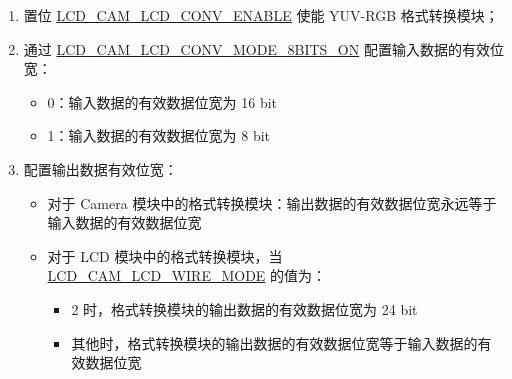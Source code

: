 \documentclass[main\_\_CN.tex]{subfiles}
\begin{document}
\begin{enumerate}
    \item 置位 \hyperref[fielddesc:LCDCAMLCDCONVENABLE]{LCD\_CAM\_LCD\_CONV\_ENABLE} 使能 YUV-RGB 格式转换模块；
    \item 通过 \hyperref[fielddesc:LCDCAMLCDCONVMODE8BITSON]{LCD\_CAM\_LCD\_CONV\_MODE\_8BITS\_ON} 配置输入数据的有效位宽：
    \begin{itemize}
        \item 0：输入数据的有效数据位宽为 16 bit
        \item 1：输入数据的有效数据位宽为 8 bit

    \end{itemize}
    \item 配置输出数据有效位宽：
    \begin{itemize}
        \item 对于 Camera 模块中的格式转换模块：输出数据的有效数据位宽永远等于输入数据的有效数据位宽
        \item 对于 LCD 模块中的格式转换模块，当 \hyperref[fielddesc:LCDCAMLCDWIREMODE]{LCD\_CAM\_LCD\_WIRE\_MODE} 的值为：
        \begin{itemize}
            \item 2 时，格式转换模块的输出数据的有效数据位宽为 24 bit
            \item 其他时，格式转换模块的输出数据的有效数据位宽等于输入数据的有效数据位宽


\end{itemize}
\end{itemize}
\end{enumerate}
\end{document}
